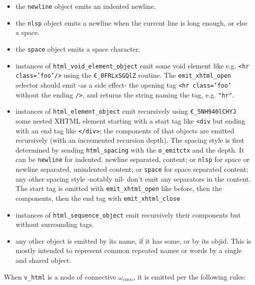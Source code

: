 \begin{itemize}
\item the \texttt{newline} object emits an indented newline.
\item the \texttt{nlsp} object emits a newline when the current line is long enough, or else a space.
\item the \texttt{space} object emits a space character.
\item instances of \texttt{html\_void\_element\_object} emit some void
  element like e.g. \texttt{<hr class='foo'/>} using the
  \texttt{€\_0FRLxSGQlZ} routine. The \texttt{emit\_xhtml\_open}
  selector should emit -as a side effect- the opening tag \texttt{<hr
    class='foo'} without the ending \texttt{/>}, and returns the string naming the tag, e.g. \texttt{"hr"}. 
\item instances of \texttt{html\_element\_object} emit recursively
  using \texttt{€\_5NH940lCHYJ} some nested XHTML element starting
  with a start tag like \texttt{<div} but ending with an end tag like
  \texttt{</div>}; the components of that objects are emitted
  recursively (with an incremented recursion depth). The spacing style
  is first determined by sending \texttt{html\_spacing} with the
  \texttt{o\_emitctx} and the depth. It can be \texttt{newline} for
  indented, newline separated, content; or \texttt{nlsp} for space or
  newline separated, unindented content; or \texttt{space} for space
  separated content; any other spacing style -notably nil- don't emit
  any separators in the content. The start tag is emitted with \texttt{emit\_xhtml\_open} like before, then the components, then the end tag with \texttt{emit\_xhtml\_close}  {}
\item instances of \texttt{html\_sequence\_object} emit
      recursively their components but without surrounding tags.
\item any other object is emitted by its name, if it has some, or by
  its objid. This is mostly intended to represent common repeated names or
  words by a single and shared object.
\end{itemize}

When  \texttt{v\_html} is a node of connective $\omega_{conn}$, it is emitted per the following rules:

